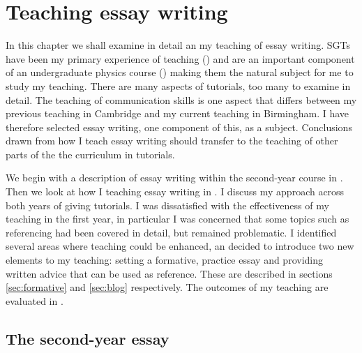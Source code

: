 \chapter{Teaching essay writing}\label{ch:essay}

In this chapter we shall examine in detail an my teaching of essay writing. SGTs have been my primary experience of teaching () and are an important component of an undergraduate physics course () making them the natural subject for me to study my teaching. There are many aspects of tutorials, too many to examine in detail. The teaching of communication skills is one aspect that differs between my previous teaching in Cambridge and my current teaching in Birmingham. I have therefore selected essay writing, one component of this, as a subject. Conclusions drawn from how I teach essay writing should transfer to the teaching of other parts of the the curriculum in tutorials.

We begin with a description of essay writing within the second-year course in . Then we look at how I teaching essay writing in . I discuss my approach across both years of giving tutorials. I was dissatisfied with the effectiveness of my teaching in the first year, in particular I was concerned that some topics such as referencing had been covered in detail, but remained problematic. I identified several areas where teaching could be enhanced, an decided to introduce two new elements to my teaching: setting a formative, practice essay and providing written advice that can be used as reference. These are described in sections \ref{sec:formative} and \ref{sec:blog} respectively. The outcomes of my teaching are evaluated in .

\section{The second-year essay}\label{sec:problem}

